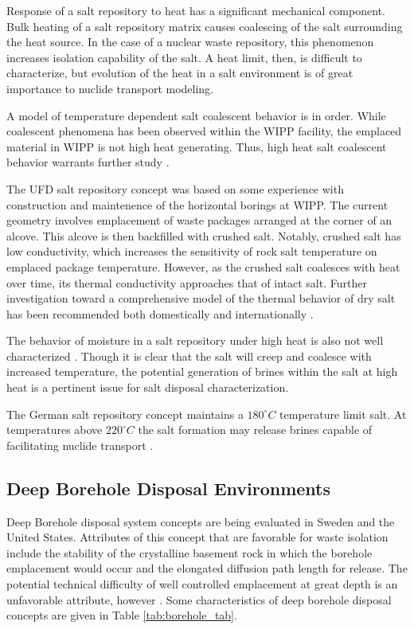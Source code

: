 Response of a salt repository to heat has a significant
mechanical component. Bulk heating of a salt repository matrix causes
coalescing  of the salt surrounding the heat source. In the case of a nuclear
waste repository, this phenomenon increases isolation capability of the salt. A
heat limit, then, is difficult to characterize, but evolution of the heat in a
salt environment is of great importance to nuclide transport modeling. 

A model of temperature dependent salt coalescent behavior is in order. While 
coalescent phenomena has been observed within the \gls{WIPP} facility, the 
emplaced material in \gls{WIPP} is not high heat generating. Thus, high heat 
salt coalescent behavior warrants further study \cite{carter_disposal_2011}.

The \gls{UFD} salt repository concept was based on some experience with 
construction and maintenence of the horizontal borings at WIPP. The 
current geometry involves emplacement of waste packages arranged at the corner 
of an alcove. This alcove is then backfilled with crushed salt. Notably, crushed salt 
has low conductivity, which increases the sensitivity of rock salt temperature 
on emplaced package temperature. However, as the crushed salt coalesces with 
heat over time, its thermal conductivity approaches that of intact salt. Further 
investigation toward a comprehensive model of the thermal behavior of dry salt 
has been recommended both domestically and internationally 
\cite{carter_disposal_2011}. 

The behavior of moisture in a salt repository under high heat is also not well 
characterized . Though it is clear that the salt will creep and coalesce with 
increased temperature, the potential generation of brines within the salt at 
high heat is a pertinent issue for salt disposal characterization. 

The German salt repository concept maintains a $180^\circ C$ temperature limit 
salt. At temperatures above $220^\circ C$ the salt formation may release 
brines capable of facilitating nuclide transport 
\cite{von_lensa_red-impact_2008}\cite{brewitz_long_2002}.


\subsection{Deep Borehole Disposal Environments}

Deep Borehole disposal system concepts are being evaluated in Sweden and the 
United States. Attributes of this concept that are favorable for waste 
isolation include the stability of the crystalline basement rock in which the 
borehole emplacement would occur and the elongated diffusion path length for 
release. The potential technical difficulty of well controlled emplacement 
at great depth is an unfavorable attribute, however \cite{hardin_generic_2011}.
Some characteristics of deep borehole disposal 
concepts are given in Table \ref{tab:borehole_tab}.   

